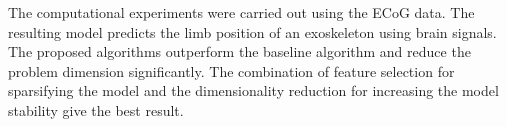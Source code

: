 \documentclass[preprint,authoryear,12pt]{elsarticle}
\theoremstyle{definition}
\begin{document}
The computational experiments were carried out using the ECoG data. 
The resulting model predicts the limb position of an exoskeleton using brain signals.
The proposed algorithms outperform the baseline algorithm and reduce the problem dimension significantly.
The combination of feature selection for sparsifying the model and the dimensionality reduction for increasing the model stability give the best result. 



\end{document}
